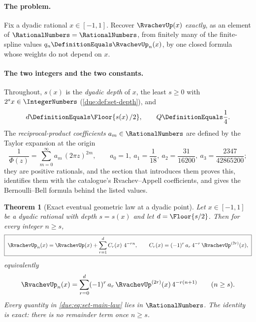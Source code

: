 \documentclass[11pt,oneside]{article}
\theoremstyle{plain}
\newtheorem{theorem}{Theorem}[section]
\theoremstyle{definition}
\theoremstyle{remark}
\newcommand{\Kk}{\RationalNumbers}                          %
\newcommand{\upn}[1]{\RvachevUp_{#1}}
\newcommand{\PhiUp}{\Phi}                                   %
\newcommand{\dep}[1]{s\!\left(#1\right)}                    %
\newcommand{\Qq}{Q}                                         %
\newcommand{\am}[1]{a_{#1}}                                 %
\newcommand{\Cr}[2]{C_{#1}\!\left(#2\right)}                %
\newcommand{\qn}[1]{q_{#1}}                                 %
\begin{document}
\paragraph{The problem.}
Fix a dyadic rational $x\in[-1,1]$.  Recover $\RvachevUp(x)$
\emph{exactly}, as an element of $\Kk=\RationalNumbers$, from finitely
many of the finite-spline values $\qn{n}\DefinitionEquals\upn{n}(x)$, by
one closed formula whose weights do not depend on $x$.

\paragraph{The two integers and the two constants.}
Throughout, $\dep{x}$ is the \emph{dyadic depth} of $x$, the least
$s\ge0$ with $2^{s}x\in\IntegerNumbers$ (\cref{due:def:set-depth}), and
\begin{equation}
 d\DefinitionEquals\Floor{\dep{x}/2},
 \qquad
 \Qq\DefinitionEquals\frac14 .
 \label{due:eq:set-d-and-Q}
\end{equation}
The \emph{reciprocal-product coefficients} $\am{m}\in\Kk$ are defined by
the Taylor expansion at the origin
\begin{equation}
 \frac{1}{\PhiUp(z)}=\sum_{m=0}^{\infty}\am{m}\,(2\pi z)^{2m},
 \qquad
 \am{0}=1,\ \am{1}=\frac1{18},\ \am{2}=\frac{31}{16200},\
 \am{3}=\frac{2347}{42865200};
 \label{due:eq:set-am-definition}
\end{equation}
they are positive rationals, and the section that introduces them proves
this, identifies them with the catalogue's Rvachev--Appell coefficients,
and gives the Bernoulli--Bell formula behind the listed values.

\begin{theorem}[Exact eventual geometric law at a dyadic point]
\label{due:thm:set-main}
Let $x\in[-1,1]$ be a dyadic rational with depth $s=\dep{x}$ and let
$d=\Floor{s/2}$.  Then for every integer $n\ge s$,
\begin{equation}
 \boxed{\;
 \upn{n}(x)=\RvachevUp(x)+\sum_{r=1}^{d}\Cr{r}{x}\,4^{-rn},
 \qquad
 \Cr{r}{x}=(-1)^{r}\,\am{r}\,4^{-r}\,\RvachevUp^{(2r)}(x),\;}
 \label{due:eq:set-main-law}
\end{equation}
equivalently
\begin{equation}
 \upn{n}(x)=\sum_{r=0}^{d}(-1)^{r}\,\am{r}\,\RvachevUp^{(2r)}(x)\,
 4^{-r(n+1)}
 \qquad(n\ge s).
 \label{due:eq:set-main-law-shifted}
\end{equation}
Every quantity in \cref{due:eq:set-main-law} lies in $\Kk$.  The identity
is exact: there is no remainder term once $n\ge s$.
\end{theorem}
\end{document}
